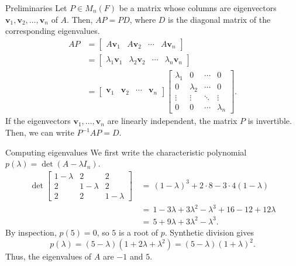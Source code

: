 \documentclass{beamer}
\def\v{\bm{v}}
\def\det{\operatorname{det}}
\begin{document}
        \begin{frame}{Preliminaries}
                Let $P \in M_n(F)$ be a matrix whose columns are eigenvectors $\v_1, \v_2, \dots, \v_n$ of $A$.
                Then, $AP = PD$, where $D$ is the diagonal matrix of the corresponding eigenvalues.
                \begin{align*}
                        AP &= \begin{bmatrix} A\v_1 & A\v_2 & \cdots & A\v_n \end{bmatrix}\\
                        &= \begin{bmatrix} \lambda_1\v_1 & \lambda_2\v_2 & \cdots & \lambda_n\v_n \end{bmatrix} \\
                        &= \begin{bmatrix}
                                \v_1 & \v_2 & \cdots & \v_n
                        \end{bmatrix}
                        \begin{bmatrix}
                                \lambda_1 & 0 & \cdots & 0 \\
                                0 & \lambda_2 & \cdots & 0 \\
                                \vdots & \vdots & \ddots & \vdots \\
                                0 & 0 & \cdots & \lambda_n
                        \end{bmatrix}.
                \end{align*}
                \pause
                If the eigenvectors $\v_1, \dots, \v_n$ are linearly independent, the matrix $P$ is invertible.
                Then, we can write  $P^{-1}AP = D$.
        \end{frame}

        \begin{frame}{Computing eigenvalues}
                We first write the characteristic polynomial $p(\lambda) = \det(A - \lambda I_n)$.
                \begin{align*}
                        \det \begin{bmatrix}
                                1 - \lambda & 2 & 2 \\ 2 & 1 - \lambda & 2 \\ 2 & 2 & 1 - \lambda
                        \end{bmatrix}
                                \,&=\, (1 - \lambda)^3  + 2\cdot 8 - 3\cdot 4(1 - \lambda) \\
                                \,&=\, 1 - 3\lambda + 3\lambda^2 - \lambda^3 + 16 - 12 + 12\lambda \\
                                \,&=\, 5 + 9\lambda + 3\lambda^2 - \lambda^3.
                \end{align*}
                \pause
                By inspection, $p(5) = 0$, so $5$ is a root of $p$. Synthetic division gives
                \[
                        p(\lambda) = (5 - \lambda)(1 + 2\lambda + \lambda^2) = (5 - \lambda)(1 + \lambda)^2.
                \]
                Thus, the eigenvalues of $A$ are $-1$ and $5$.
        \end{frame}
\end{document}
